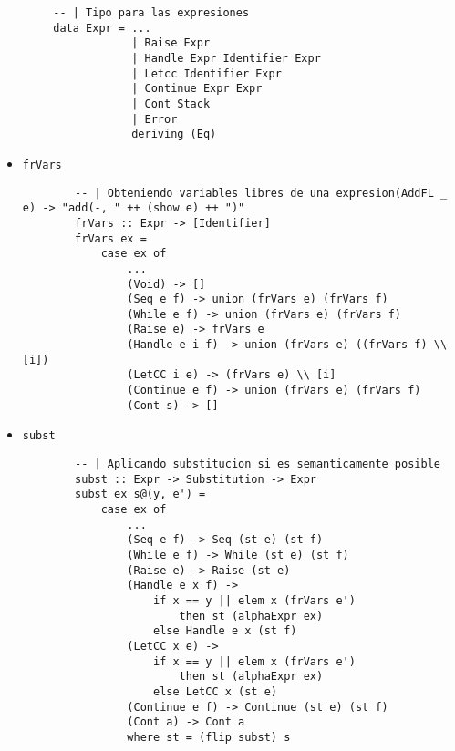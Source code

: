 \documentclass{article}
\newcommand{\tx}[1]{\texttt{#1}}
\begin{document}
    \begin{verbatim}
        -- | Tipo para las expresiones
        data Expr = ...
                    | Raise Expr
                    | Handle Expr Identifier Expr
                    | Letcc Identifier Expr
                    | Continue Expr Expr
                    | Cont Stack
                    | Error
                    deriving (Eq)
    \end{verbatim}
    \begin{itemize}
        \item \tx{frVars}
        \begin{verbatim}
        -- | Obteniendo variables libres de una expresion(AddFL _ e) -> "add(-, " ++ (show e) ++ ")"
        frVars :: Expr -> [Identifier]
        frVars ex =
            case ex of
                ...
                (Void) -> []
                (Seq e f) -> union (frVars e) (frVars f)
                (While e f) -> union (frVars e) (frVars f)
                (Raise e) -> frVars e
                (Handle e i f) -> union (frVars e) ((frVars f) \\ [i])
                (LetCC i e) -> (frVars e) \\ [i]
                (Continue e f) -> union (frVars e) (frVars f)
                (Cont s) -> []
        \end{verbatim}
        
        \item \tx{subst}
        \begin{verbatim}
        -- | Aplicando substitucion si es semanticamente posible
        subst :: Expr -> Substitution -> Expr
        subst ex s@(y, e') =
            case ex of
                ...
                (Seq e f) -> Seq (st e) (st f)
                (While e f) -> While (st e) (st f)
                (Raise e) -> Raise (st e)
                (Handle e x f) ->
                    if x == y || elem x (frVars e')
                        then st (alphaExpr ex)
                    else Handle e x (st f)
                (LetCC x e) ->
                    if x == y || elem x (frVars e')
                        then st (alphaExpr ex)
                    else LetCC x (st e)
                (Continue e f) -> Continue (st e) (st f)
                (Cont a) -> Cont a
                where st = (flip subst) s
        \end{verbatim}
        

\end{itemize}
\end{document}
